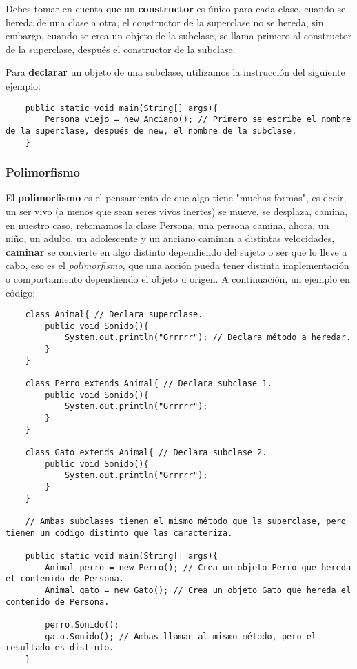 Debes tomar en cuenta que un \textbf{constructor} es único para cada clase, cuando se hereda de una clase a otra, el constructor de la superclase no se hereda, sin embargo, cuando se crea un objeto de la subclase, se llama primero al constructor de la superclase, después el constructor de la subclase.

Para \textbf{declarar} un objeto de una subclase, utilizamos la instrucción del siguiente ejemplo:
\begin{lstlisting}
    public static void main(String[] args){
        Persona viejo = new Anciano(); // Primero se escribe el nombre de la superclase, después de new, el nombre de la subclase.
    }
\end{lstlisting}


\subsubsection{Polimorfismo}

El \textbf{polimorfismo} es el pensamiento de que algo tiene "muchas formas", es decir, un ser vivo (a menos que sean seres vivos inertes) se mueve, se desplaza, camina, en nuestro caso, retomamos la clase Persona, una persona camina, ahora, un niño, un adulto, un adolescente y un anciano caminan a distintas velocidades, \textbf{caminar} se convierte en algo distinto dependiendo del sujeto o ser que lo lleve a cabo, eso es el \textit{polimorfismo}, que una acción pueda tener distinta implementación o comportamiento dependiendo el objeto u origen.
A continuación, un ejemplo en código:
\begin{lstlisting}
    class Animal{ // Declara superclase.
        public void Sonido(){
            System.out.println("Grrrrr"); // Declara método a heredar.
        }
    }
    
    class Perro extends Animal{ // Declara subclase 1.
        public void Sonido(){
            System.out.println("Grrrrr");
        }
    }
    
    class Gato extends Animal{ // Declara subclase 2.
        public void Sonido(){
            System.out.println("Grrrrr");
        }
    }
    
    // Ambas subclases tienen el mismo método que la superclase, pero tienen un código distinto que las caracteriza.
    
    public static void main(String[] args){
        Animal perro = new Perro(); // Crea un objeto Perro que hereda el contenido de Persona.
        Animal gato = new Gato(); // Crea un objeto Gato que hereda el contenido de Persona.
        
        perro.Sonido();
        gato.Sonido(); // Ambas llaman al mismo método, pero el resultado es distinto.
    }
\end{lstlisting}

